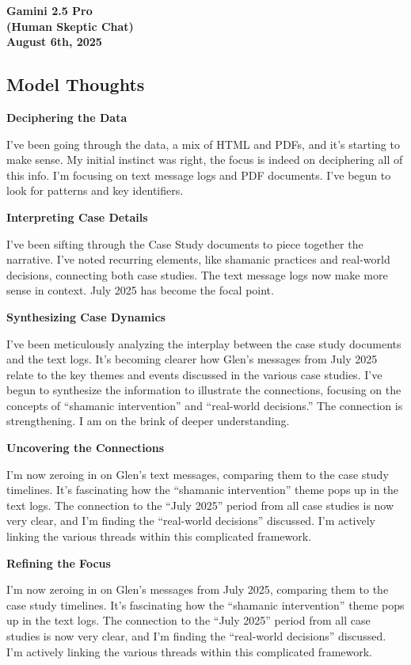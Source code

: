 \documentclass{article}
\begin{document}
\begin{center}
\textbf{Gamini 2.5 Pro}\\
\textbf{(Human Skeptic Chat)}\\
\textbf{August 6th, 2025}
\end{center}

\subsection*{Model Thoughts}\label{model-thoughts}

\textbf{Deciphering the Data}

I've been going through the data, a mix of HTML and PDFs, and it's starting to make sense. My initial instinct was right, the focus is indeed on deciphering all of this info. I'm focusing on text message logs and PDF documents. I've begun to look for patterns and key identifiers.

\textbf{Interpreting Case Details}

I've been sifting through the Case Study documents to piece together the narrative. I've noted recurring elements, like shamanic practices and real-world decisions, connecting both case studies. The text message logs now make more sense in context. July 2025 has become the focal point.

\textbf{Synthesizing Case Dynamics}

I've been meticulously analyzing the interplay between the case study documents and the text logs. It's becoming clearer how Glen's messages from July 2025 relate to the key themes and events discussed in the various case studies. I've begun to synthesize the information to illustrate the connections, focusing on the concepts of ``shamanic intervention'' and ``real-world decisions.'' The connection is strengthening. I am on the brink of deeper understanding.

\textbf{Uncovering the Connections}

I'm now zeroing in on Glen's text messages, comparing them to the case study timelines. It's fascinating how the ``shamanic intervention'' theme pops up in the text logs. The connection to the ``July 2025'' period from all case studies is now very clear, and I'm finding the ``real-world decisions'' discussed. I'm actively linking the various threads within this complicated framework.

\textbf{Refining the Focus}

I'm now zeroing in on Glen's messages from July 2025, comparing them to the case study timelines. It's fascinating how the ``shamanic intervention'' theme pops up in the text logs. The connection to the ``July 2025'' period from all case studies is now very clear, and I'm finding the ``real-world decisions'' discussed. I'm actively linking the various threads within this complicated framework.
\end{document}
